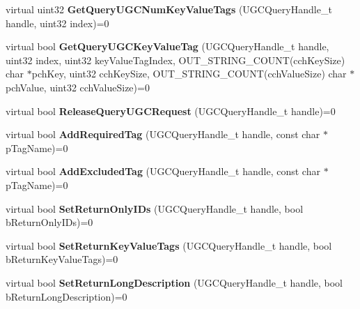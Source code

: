\begin{DoxyCompactItemize}
virtual uint32 {\bfseries Get\+Query\+U\+G\+C\+Num\+Key\+Value\+Tags} (U\+G\+C\+Query\+Handle\+\_\+t handle, uint32 index)=0
\item 
\mbox{\label{class_i_steam_u_g_c_a6e045ebc417b3157d5713b8f06d76189}} 
virtual bool {\bfseries Get\+Query\+U\+G\+C\+Key\+Value\+Tag} (U\+G\+C\+Query\+Handle\+\_\+t handle, uint32 index, uint32 key\+Value\+Tag\+Index, O\+U\+T\+\_\+\+S\+T\+R\+I\+N\+G\+\_\+\+C\+O\+U\+NT(cch\+Key\+Size) char $\ast$pch\+Key, uint32 cch\+Key\+Size, O\+U\+T\+\_\+\+S\+T\+R\+I\+N\+G\+\_\+\+C\+O\+U\+NT(cch\+Value\+Size) char $\ast$pch\+Value, uint32 cch\+Value\+Size)=0
\item 
\mbox{\label{class_i_steam_u_g_c_a4157e9b5ce82b0abfd436675c6fe3ba6}} 
virtual bool {\bfseries Release\+Query\+U\+G\+C\+Request} (U\+G\+C\+Query\+Handle\+\_\+t handle)=0
\item 
\mbox{\label{class_i_steam_u_g_c_a9eb0d974840e25ea042ca8f78e0f27d8}} 
virtual bool {\bfseries Add\+Required\+Tag} (U\+G\+C\+Query\+Handle\+\_\+t handle, const char $\ast$p\+Tag\+Name)=0
\item 
\mbox{\label{class_i_steam_u_g_c_acfb8abf198a2c05c40e83f117275f7b7}} 
virtual bool {\bfseries Add\+Excluded\+Tag} (U\+G\+C\+Query\+Handle\+\_\+t handle, const char $\ast$p\+Tag\+Name)=0
\item 
\mbox{\label{class_i_steam_u_g_c_a154cbdf0cec8a343d8a54d6c0452afea}} 
virtual bool {\bfseries Set\+Return\+Only\+I\+Ds} (U\+G\+C\+Query\+Handle\+\_\+t handle, bool b\+Return\+Only\+I\+Ds)=0
\item 
\mbox{\label{class_i_steam_u_g_c_a1f8271d5968ab5657ec7b43a0b8a3903}} 
virtual bool {\bfseries Set\+Return\+Key\+Value\+Tags} (U\+G\+C\+Query\+Handle\+\_\+t handle, bool b\+Return\+Key\+Value\+Tags)=0
\item 
\mbox{\label{class_i_steam_u_g_c_ac8502ab719c8b08d73c2eed384900eeb}} 
virtual bool {\bfseries Set\+Return\+Long\+Description} (U\+G\+C\+Query\+Handle\+\_\+t handle, bool b\+Return\+Long\+Description)=0
\item 
\mbox{\label{class_i_steam_u_g_c_a88451713f55c82c7c105fc841243195a}} 

\end{DoxyCompactItemize}
